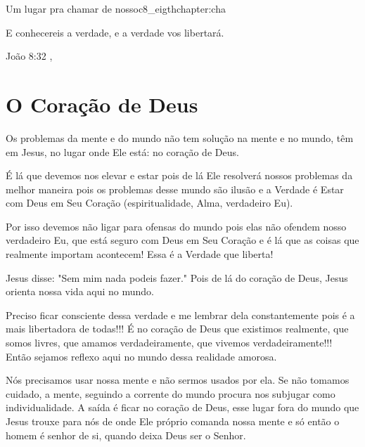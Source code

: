 \begin{chapterpage}{Um lugar pra chamar de nosso}{c8_eigthchapter:cha}

\begin{myquotation} E conhecereis a verdade, e a verdade vos libertará.

\par\vspace*{15mm}
\mbox{}\hfill \emdash{}João 8:32 
, %
\par\end{myquotation}

\end{chapterpage}



\section{O Coração de Deus}\label{c1_basicformatting:sec}

\emdash{}Os problemas da mente e do mundo não tem solução na mente e no mundo, têm em Jesus, no lugar onde Ele está: no coração de Deus.

\emdash{}É lá que devemos nos elevar e estar pois de lá Ele resolverá nossos problemas da melhor maneira pois os problemas desse mundo são ilusão e a Verdade é Estar com Deus em Seu Coração (espiritualidade, Alma, verdadeiro Eu).

\emdash{}Por isso devemos não ligar para ofensas do mundo pois elas não ofendem nosso verdadeiro Eu, que está seguro com Deus em Seu Coração e é lá que as coisas que realmente importam acontecem! Essa é a Verdade que liberta!

\emdash{}Jesus disse: "Sem mim nada podeis fazer." Pois de lá do coração de Deus, Jesus orienta nossa vida aqui no mundo. 

\emdash{}Preciso ficar consciente dessa verdade e me lembrar dela constantemente pois é a mais libertadora de todas!!! É no coração de Deus que existimos realmente, que somos livres, que amamos verdadeiramente, que vivemos verdadeiramente!!! Então sejamos reflexo aqui no mundo dessa realidade amorosa.

\emdash{}Nós precisamos usar nossa mente e não sermos usados por ela. Se não tomamos cuidado, a mente, seguindo a corrente do mundo procura nos subjugar como individualidade. A saída é ficar no coração de Deus, esse lugar fora do mundo que Jesus trouxe para nós de onde Ele próprio comanda nossa mente e só então o homem é senhor de si, quando deixa Deus ser o Senhor.